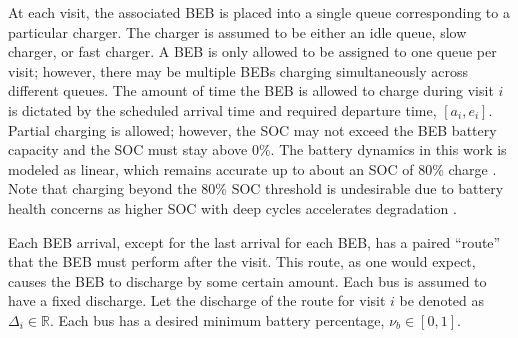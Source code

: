 \documentclass[ee,thesis]{usuthesis}
\begin{document}
At each visit, the associated BEB is placed into a single queue corresponding to a particular charger. The charger is
assumed to be either an idle queue, slow charger, or fast charger. A BEB is only allowed to be assigned to one queue per
visit; however, there may be multiple BEBs charging simultaneously across different queues. The amount of time the BEB
is allowed to charge during visit \(i\) is dictated by the scheduled arrival time and required departure time, \([a_i,
e_i]\). Partial charging is allowed; however, the SOC may not exceed the BEB battery capacity and the SOC must stay above
0\%. The battery dynamics in this work is modeled as linear, which remains accurate up to about an SOC of 80\% charge
\cite{liu-2020-batter-elect}. Note that charging beyond the 80\% SOC threshold is undesirable due to battery health
concerns as higher SOC with deep cycles accelerates degradation \cite{edge-2021-lithium,millner-2010-model-lithium}.

Each BEB arrival, except for the last arrival for each BEB, has a paired ``route'' that the BEB must perform after the
visit. This route, as one would expect, causes the BEB to discharge by some certain amount. Each bus is assumed to have
a fixed discharge. Let the discharge of the route for visit \(i\) be denoted as \(\Delta_i \in \mathbb{R}\). Each bus has a desired minimum
battery percentage, \(\nu_b \in [0, 1]\).
\end{document}
